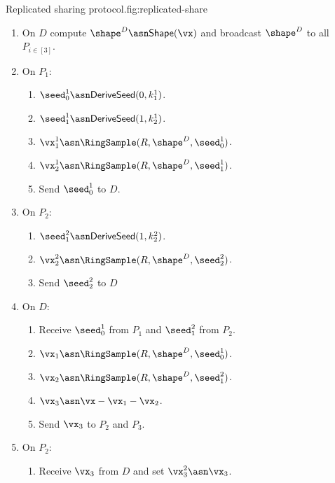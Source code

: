 \begin{Boxfig}{Replicated sharing protocol.}{fig:replicated-share}
\begin{enumerate}
      \begin{enumerate}
        \item On $D$ compute $\shape^D \asn \mathsf{Shape}(\vx)$ and broadcast $\shape^D$ to all $P_{i \in [3]}$.

        \item On $P_1$:
        \begin{enumerate}
          \item $\seed_0^1 \asn \mathsf{DeriveSeed}(0, k_1^1)$.
          \item $\seed_1^1 \asn \mathsf{DeriveSeed}(1, k_2^1)$.
          \item $\vx_1^1 \asn \RingSample(R, \shape^D, \seed_0^1)$.
          \item $\vx_2^1 \asn \RingSample(R, \shape^D, \seed_1^1)$.
          \item Send $\seed_0^1$ to $D$.
        \end{enumerate}

        \item On $P_2$:
        \begin{enumerate}
          \item $\seed_1^2 \asn \mathsf{DeriveSeed}(1, k_2^2)$.
          \item $\vx_2^2 \asn \RingSample(R, \shape^D, \seed_2^2)$.
          \item Send $\seed_2^2$ to $D$
        \end{enumerate}

        \item On $D$:
        \begin{enumerate}
          \item Receive $\seed_0^1$ from $P_1$ and $\seed_1^2$ from $P_2$.
          \item $\vx_1 \asn \RingSample(R, \shape^D, \seed_0^1)$.
          \item $\vx_2 \asn \RingSample(R, \shape^D, \seed_1^2)$.
          \item $\vx_3 \asn \vx - \vx_1 - \vx_2$.
          \item Send $\vx_3$ to $P_2$ and $P_3$.
        \end{enumerate}

        \item On $P_2$:
        \begin{enumerate}
          \item Receive $\vx_3$ from $D$ and set $\vx_3^2 \asn \vx_3$.
        \end{enumerate}


\end{enumerate}
\end{enumerate}
\end{Boxfig}
